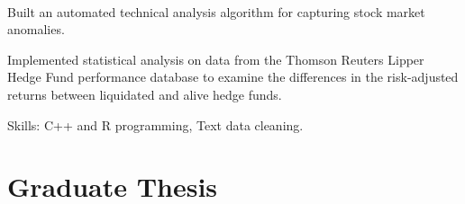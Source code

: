 \documentclass[]{hieudo-build}
\begin{document}
\begin{minipage}[t]{0.65\textwidth}
 \\
\begin{tightemize}
\item Built an automated technical analysis algorithm for capturing stock market anomalies.
\item Implemented statistical analysis on data from the Thomson Reuters Lipper Hedge Fund performance database to examine the differences in the risk-adjusted returns between liquidated and alive hedge funds.
\item Skills: C++ and R programming, Text data cleaning.
\end{tightemize}



\section{Graduate Thesis}


\end{minipage}
\end{document}

